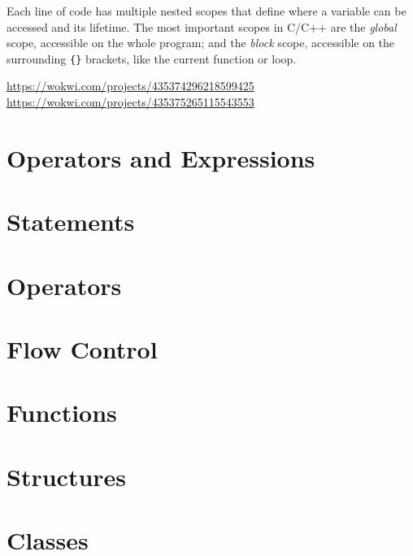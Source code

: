 Each line of code has multiple nested scopes that define where a variable can be accessed and its lifetime.
The most important scopes in C/C++ are the
\emph{global} scope, accessible on the whole program;
and the \emph{block} scope, accessible on the surrounding \texttt{\{\}} brackets, like the current function or loop.


\url{https://wokwi.com/projects/435374296218599425}
\url{https://wokwi.com/projects/435375265115543553}


\section{Operators and Expressions}

\section{Statements}
\section{Operators}
\section{Flow Control}
\section{Functions}
\section{Structures}
\section{Classes}


